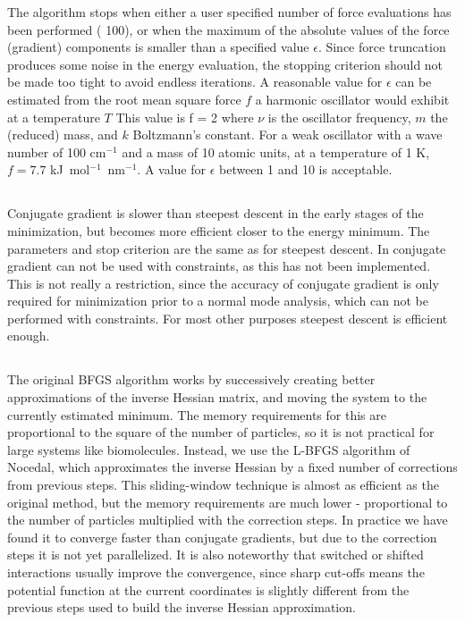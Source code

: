 The algorithm stops when either a user specified number of force 
evaluations has been performed ({\eg} 100), or when the maximum of the absolute
values of the force (gradient) components is smaller than a specified
value $\epsilon$.
Since force truncation produces some noise in the
energy evaluation, the stopping criterion should not be made too tight
to avoid endless iterations. A reasonable value for $\epsilon$ can be
estimated from the root mean square force $f$ a harmonic oscillator would exhibit at a
temperature $T$ This value is 
\beq
  f = 2 \pi \nu {}
\eeq
where $\nu$ is the oscillator frequency, $m$ the (reduced) mass, and
$k$ Boltzmann's constant. For a weak oscillator with a wave number of
100 cm$^{-1}$ and a mass of 10 atomic units, at a temperature of 1 K,
$f=7.7$ kJ~mol$^{-1}$~nm$^{-1}$. A value for $\epsilon$ between 1 and
10 is acceptable.   

\subsection{}
Conjugate gradient is slower than steepest descent in the early stages of
the minimization, but becomes more efficient closer to the energy minimum.
The parameters and stop criterion are the same as for steepest descent.
In {\gromacs} conjugate gradient can not be used with constraints,
as this has not been implemented. This is not really a restriction,
since the accuracy of conjugate gradient is only required for minimization
prior to a normal mode analysis, which can not be performed with constraints.
For most other purposes steepest descent is efficient enough.

\subsection{}
The original BFGS algorithm works by successively creating better 
approximations of the inverse Hessian matrix, and moving the system to the 
currently estimated minimum. The memory requirements for this are proportional
to the square of the number of particles, so it is not practical for large
systems like biomolecules. Instead, we use the L-BFGS algorithm of Nocedal, 
which approximates the inverse Hessian by a fixed number of corrections from
previous steps. This sliding-window technique is almost as efficient as the
original method, but the memory requirements are much lower - proportional
to the number of particles multiplied with the correction steps. In practice
we have found it to converge faster than conjugate gradients, but due to the
correction steps it is not yet parallelized.  It is also noteworthy that
switched or shifted interactions usually improve the convergence, since 
sharp cut-offs means the potential function at the current coordinates is
slightly different from the previous steps used to build the inverse Hessian
approximation. 


